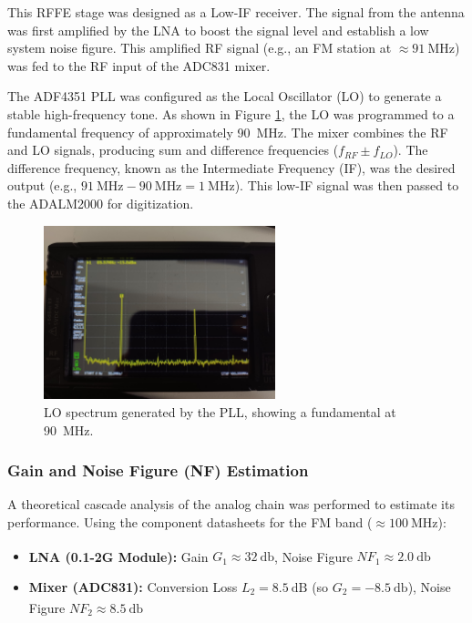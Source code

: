 This RFFE stage was designed as a Low-IF receiver. The signal from the antenna was first amplified by the LNA to boost the signal level and establish a low system noise figure. This amplified RF signal (e.g., an FM station at $\approx \SI{91}{\mega\hertz}$) was fed to the RF input of the ADC831 mixer.

The ADF4351 PLL was configured as the Local Oscillator (LO) to generate a stable high-frequency tone. As shown in Figure \ref{fig:RFFE_LO}, the LO was programmed to a fundamental frequency of approximately \SI{90}{\mega\hertz}. The mixer combines the RF and LO signals, producing sum and difference frequencies ($f_{RF} \pm f_{LO}$). The difference frequency, known as the Intermediate Frequency (IF), was the desired output (e.g., $\SI{91}{\mega\hertz} - \SI{90}{\mega\hertz} = \SI{1}{\mega\hertz}$). This low-IF signal was then passed to the ADALM2000 for digitization.

\begin{figure}[H]
    \centering
    \includegraphics*[width=0.6\textwidth]{Images/RRFE_LO.jpeg}
    \caption{LO spectrum generated by the PLL, showing a fundamental at \SI{90}{\mega\hertz}.}
    \label{fig:RFFE_LO}
\end{figure}


\subsubsection{Gain and Noise Figure (NF) Estimation}

A theoretical cascade analysis of the analog chain was performed to estimate its performance. Using the component datasheets for the FM band ($\approx \SI{100}{\mega\hertz}$):
\begin{itemize}
    \item \textbf{LNA (0.1-2G Module):} Gain $G_1 \approx \SI{32}{\decibel}$, Noise Figure $NF_1 \approx \SI{2.0}{\decibel}$ \textsuperscript{\cite{spf5189z:datasheet}}
    \item \textbf{Mixer (ADC831):} Conversion Loss $L_2 = \SI{8.5}{\deci\bel}$ (so $G_2 = \SI{-8.5}{\decibel}$), Noise Figure $NF_2 \approx \SI{8.5}{\decibel}$ \textsuperscript{\cite{ad831:datasheet}}
\end{itemize}

